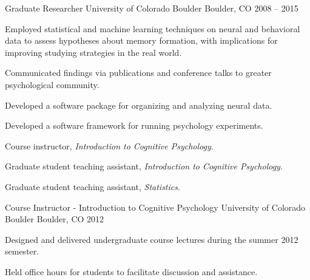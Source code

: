 \begin{cventries}
  \cventry
    {Graduate Researcher} %
    {University of Colorado Boulder} %
    {Boulder, CO} %
    {2008 -- 2015} %
    {
      \begin{cvitems} %
        \item {Employed statistical and machine learning techniques on neural and behavioral data to assess hypotheses about memory formation, with implications for improving studying strategies in the real world.}
        \item {Communicated findings via publications and conference talks to greater psychological community.}
        \item {Developed a software package for organizing and analyzing neural data.}
        \item {Developed a software framework for running psychology experiments.}
        \item {Course instructor, \textit{Introduction to Cognitive Psychology}.}
        \item {Graduate student teaching assistant, \textit{Introduction to Cognitive Psychology}.}
        \item {Graduate student teaching assistant, \textit{Statistics}.}
      \end{cvitems}
    }

  \cventry
    {Course Instructor - Introduction to Cognitive Psychology} %
    {University of Colorado Boulder} %
    {Boulder, CO} %
    {2012} %
    {
      \begin{cvitems} %
        \item {Designed and delivered undergraduate course lectures during the summer 2012 semester.}
        \item {Held office hours for students to facilitate discussion and assistance.}
      \end{cvitems}
    }


\end{cventries}
